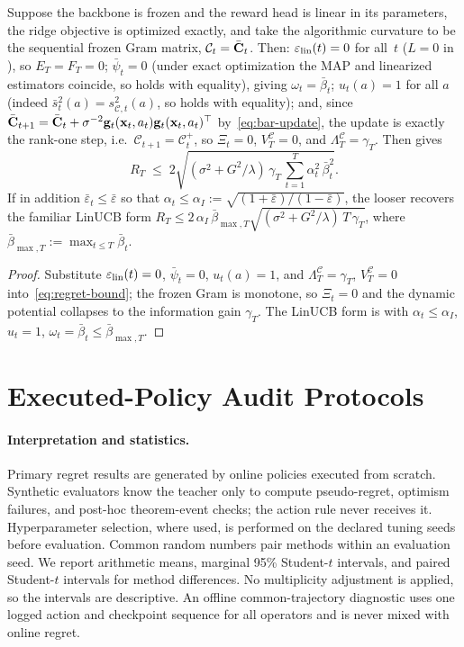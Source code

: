 \documentclass[twoside]{article}
\newcommand{\Calg}{\mathcal{C}}                 %
\newcommand{\Lamalg}{\Lambda^{\Calg}}           %
\newcommand{\Valg}{V^{\Calg}}                   %
\begin{document}
\begin{corollary}\label{cor:frozen}
Suppose the backbone is frozen and the reward head is linear in its
parameters, the ridge objective is optimized exactly, and take the algorithmic curvature to be the sequential frozen
Gram matrix, $\Calg_t=\bCbar_t$.  Then:
$\varepsilon_{\mathrm{lin}}(t)=0$ for all~$t$ ($L=0$ in ), so $E_T=F_T=0$;
$\bar\psi_t=0$ (under exact optimization the MAP and linearized estimators coincide, so
 holds with equality), giving $\omega_t=\bar\beta_t$;
$u_t(a)=1$ for all $a$ (indeed $\bar s_t^2(a)=s_{\Calg,t}^2(a)$, so
 holds with equality); and, since
$\bar{\mathbf{C}}_{t+1}=\bar{\mathbf{C}}_t+\sigma^{-2}\mathbf{g}_t(\mathbf{x}_t,a_t)\mathbf{g}_t(\mathbf{x}_t,a_t)^\top$
by~\eqref{eq:bar-update}, the update is exactly the rank-one step, i.e.\
$\Calg_{t+1}=\Calg_t^{+}$, so $\Xi_t=0$, $\Valg_T=0$, and
$\Lamalg_T=\gamma_T$.  Then  gives
\[
  R_T
  \;\le\;
  2\sqrt{(\sigma^2+G^2/\lambda)\,\gamma_T\,
    \sum_{t=1}^T \alpha_t^2\,\bar\beta_t^2}.
\]
If in addition $\bar\varepsilon_t\le\bar\varepsilon$ so that
$\alpha_t\le\alpha_I:=\sqrt{(1+\bar\varepsilon)/(1-\bar\varepsilon)}$, the
looser \Cref{cor:worstcase} recovers the familiar LinUCB form
$R_T\le 2\,\alpha_I\,\bar\beta_{\max,T}\sqrt{(\sigma^2+G^2/\lambda)\,T\,\gamma_T}$,
where $\bar\beta_{\max,T}:=\max_{t\le T}\bar\beta_t$.
\end{corollary}
\begin{proof}
Substitute $\varepsilon_{\mathrm{lin}}(t)=0$, $\bar\psi_t=0$, $u_t(a)=1$, and
$\Lamalg_T=\gamma_T$, $\Valg_T=0$ into~\eqref{eq:regret-bound}; the frozen
Gram is monotone, so $\Xi_t=0$ and the dynamic potential collapses to the
information gain $\gamma_T$.  The LinUCB form is \Cref{cor:worstcase} with
$\alpha_t\le\alpha_I$, $u_t=1$, $\omega_t=\bar\beta_t\le\bar\beta_{\max,T}$.
\end{proof}



\section{Executed-Policy Audit Protocols}\label{app:new-experiments}

\paragraph{Interpretation and statistics.}
Primary regret results are generated by online policies executed from scratch.
Synthetic evaluators know the teacher only to compute pseudo-regret, optimism
failures, and post-hoc theorem-event checks; the action rule never receives it.  Hyperparameter
selection, where used, is performed on the declared tuning seeds before evaluation.
Common random numbers pair methods within an evaluation seed.  We report arithmetic
means, marginal 95\% Student-$t$ intervals, and paired Student-$t$ intervals for
method differences.  No multiplicity adjustment is applied, so the intervals are
descriptive.  An offline common-trajectory diagnostic uses one logged action and
checkpoint sequence for all operators and is never mixed with online regret.
\end{document}
